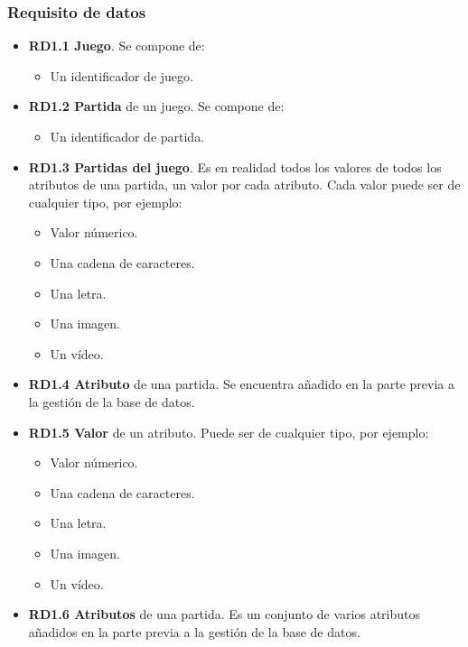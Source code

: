 \subsubsection{Requisito de datos}

\begin{itemize}
	\item \textbf{RD1.1 Juego}. Se compone de:
	\begin{itemize}
		\item Un identificador de juego.
	\end{itemize}
	
	\item \textbf{RD1.2 Partida} de un juego.  Se compone de:
	\begin{itemize}
		\item Un identificador de partida.
	\end{itemize}
	
	\item \textbf{RD1.3 Partidas del juego}. Es en realidad todos los valores de todos los atributos de una partida, un valor por cada atributo. Cada valor puede ser de cualquier tipo, por ejemplo:
	\begin{itemize}
		\item Valor númerico.
		\item Una cadena de caracteres.
		\item Una letra.
		\item Una imagen.
		\item Un vídeo.
	\end{itemize}
	
	\item \textbf{RD1.4 Atributo} de una partida. Se encuentra añadido en la parte previa a la gestión de la base de datos.
	
	\item \textbf{RD1.5 Valor} de un atributo. Puede ser de cualquier tipo, por ejemplo:
	\begin{itemize}
		\item Valor númerico.
		\item Una cadena de caracteres.
		\item Una letra.
		\item Una imagen.
		\item Un vídeo.
	\end{itemize}
	
	\item \textbf{RD1.6 Atributos} de una partida. Es un conjunto de varios atributos añadidos en la parte previa a la gestión de la base de datos.
	

\end{itemize}
